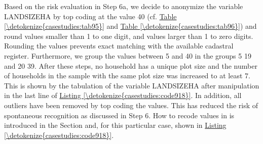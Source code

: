 \documentclass[letterpaper,10pt,english]{sphinxmanual}
\begin{document}
Based on the risk evaluation in Step 6a, we decide to anonymize the
variable LANDSIZEHA by top coding at the value 40 (cf. \hyperref[\detokenize{casestudies:tab95}]{Table \ref{\detokenize{casestudies:tab95}}} and
\hyperref[\detokenize{casestudies:tab96}]{Table \ref{\detokenize{casestudies:tab96}}}) and round values smaller than 1 to one digit, and values
larger than 1 to zero digits. Rounding the values prevents exact
matching with the available cadastral register. Furthermore, we group
the values between 5 and 40 in the groups 5 \textendash{} 19 and 20 \textendash{} 39. After
these steps, no household has a unique plot size and the number of
households in the sample with the same plot size was increased to at
least 7. This is shown by the tabulation of the variable LANDSIZEHA
after manipulation in the last line of \hyperref[\detokenize{casestudies:code918}]{Listing \ref{\detokenize{casestudies:code918}}}. In addition, all
outliers have been removed by top coding the values. This has reduced
the risk of spontaneous recognition as discussed in Step 6. How to
recode values in  is introduced in the Section 
and, for this particular case, shown in \hyperref[\detokenize{casestudies:code918}]{Listing \ref{\detokenize{casestudies:code918}}}.
\end{document}
